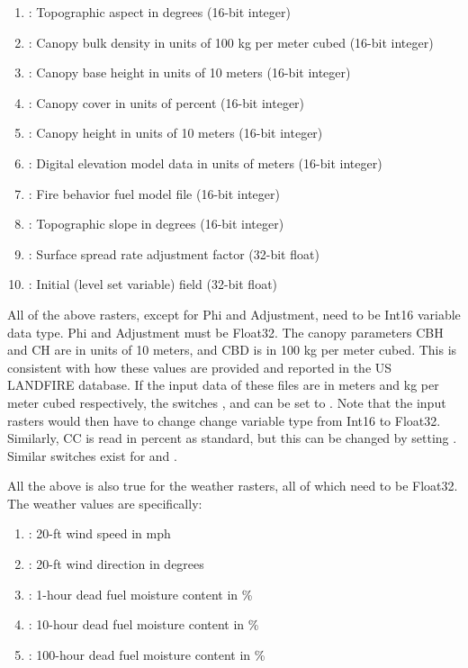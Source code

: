\begin{enumerate}
    \item {}: Topographic aspect in degrees (16-bit integer)
    \item {}: Canopy bulk density in units of 100 kg per meter cubed (16-bit integer)
    \item {}: Canopy base height in units of 10 meters (16-bit integer)
    \item {}: Canopy cover in units of percent (16-bit integer)
    \item {}: Canopy height in units of 10 meters (16-bit integer)
    \item {}: Digital elevation model data in units of meters (16-bit integer)
    \item {}: Fire behavior fuel model file (16-bit integer)
    \item {}: Topographic slope in degrees (16-bit integer)
    \item {}: Surface spread rate adjustment factor (32-bit float)
    \item {}: Initial (level set variable) field (32-bit float)
\end{enumerate}

All of the above rasters, except for Phi and Adjustment, need to be Int16 variable data type. Phi and Adjustment must be Float32. The canopy parameters CBH and CH are in units of 10 meters, and CBD is in 100 kg per meter cubed. This is consistent with how these values are provided and reported in the US LANDFIRE database. If the input data of these files are in meters and kg per meter cubed respectively, the switches ,  and  can be set to . Note that the input rasters would then have to change change variable type from Int16 to Float32. Similarly, CC is read in percent as standard, but this can be changed by setting . Similar switches exist for  and .

All the above is also true for the weather rasters, all of which need to be Float32. The weather values are specifically:

\begin{enumerate}
    \item {}: 20-ft wind speed in mph
    \item {}: 20-ft wind direction in degrees
    \item {}: 1-hour dead fuel moisture content in \%
    \item {}: 10-hour dead fuel moisture content in \%
    \item {}: 100-hour dead fuel moisture content in \%
\end{enumerate}

